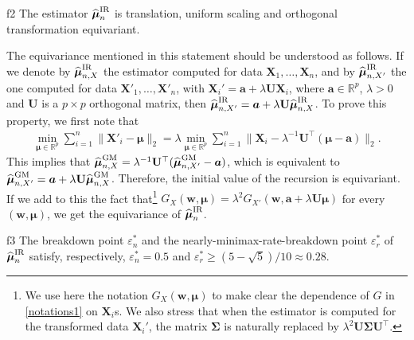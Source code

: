 \documentclass[aos,preprint,reqno]{imsart}
\newcommand\bs{\boldsymbol}
\newcommand\bmu{\boldsymbol\mu}
\newcommand\bSigma{\boldsymbol\Sigma}
\newcommand\bfU{\mathbf U}
\newcommand\bX{\boldsymbol X}
\newcommand\bw{\boldsymbol w}
\newcommand\RR{\mathbb R}
\def\hat{\widehat}
\theoremstyle{plain}
\theoremstyle{remark}
\begin{document}
	\begin{center}
		\begin{minipage}{0.90\linewidth}
			\begin{fact}{}{f2}
				The estimator $\hat{\bmu}_n^{\textup{IR}}$ is 
				translation, uniform scaling and orthogonal 
				transformation equivariant. 
			\end{fact}	
		\end{minipage}
	\end{center}


	The equivariance mentioned in this statement should be 
	understood as follows. If we denote by $\hat{\bmu}_{n,X}^{
	\textup{IR}}$ the estimator computed for data $\bX_1,\ldots,
	\bX_n$, and by $\hat{\bmu}_{n,X'}^{\textup{IR}}$ the one 
	computed for data $\bX'_1,\ldots,\bX'_n$, with $\bX_i' = 
	\bs a + \lambda\bfU \bX_i$, where $\bs a\in\RR^p$, 
	$\lambda>0$ and $\bfU$ is a $p\times p$ orthogonal matrix, 
	then $\hat{\bmu}_{n,X'}^{\textup{IR}} = \bs a + \lambda\bfU
	\hat{\bmu}_{n,X}^{\textup{IR}}$. 
	To prove this property, we first note that 
	\begin{align}
	 \min_{\bmu\in\RR^p} \sum_{i=1}^n\|\bX'_i-\bmu\|_2 = 
	 \lambda\min_{\bmu\in\RR^p}\sum_{i=1}^n\|\bX_i-
	 \lambda^{-1}\bfU^\top(\bmu-\bs a)\|_2.
	\end{align}   
	This implies that $\hat{\bmu}_{n,X}^{\textup{GM}} = 
	\lambda^{-1}\bfU^\top(\hat{\bmu}_{n,X'}^{\textup{GM}} -\bs a)$, 
	which is equivalent to $\hat{\bmu}_{n,X'}^{\textup{GM}} 
	= \bs a + \lambda\bfU\hat{\bmu}_{n,X}^{\textup{GM}}$. 
	Therefore, the initial value of the recursion is equivariant. 
	If we add to this the fact that\footnote{We use here the 
	notation $G_X(\bw,\bmu)$ to make clear the dependence of 
	$G$ in \eqref{notations1} on $\bX_i$s. We also stress that 
	when the estimator is computed for the transformed data 
	$\bX_i'$, the matrix $\bSigma$ is naturally replaced by
	$\lambda^2\bfU\bSigma\bfU^\top$.} $G_X(\bw,\bmu) =\lambda^2 
	G_{X'}(\bw,\bs a + \lambda\bfU\bmu)$ for every $(\bw,\bmu)$, 
	we get the equivariance of $\hat{\bmu}_n^{\textup{IR}}$.


	\begin{center}
		\begin{minipage}{0.90\linewidth}
			\begin{fact}{}{f3}
					The breakdown point $\varepsilon^*_n$ and the nearly-minimax-rate-breakdown 
					point $\varepsilon^*_r$ of $\hat{\bmu}_n^{\textup{IR}}$ 
					satisfy, respectively, $\varepsilon^*_n=0.5$ and $\varepsilon^*_r\ge 
					(5-\sqrt{5})/10\approx 0.28$.
			\end{fact}
		\end{minipage}
	\end{center}
\end{document}
